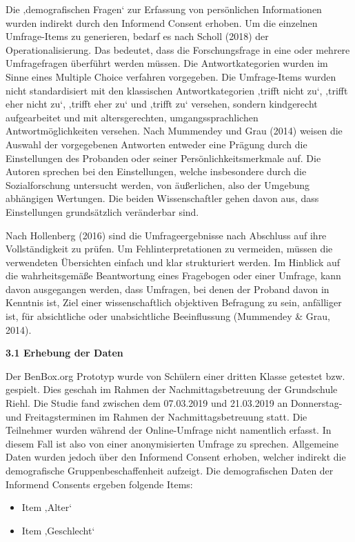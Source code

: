 \documentclass[
  a4paper,
  DIV=11,
  numbers=noendperiod,
  onecolumn,
  oneside,
  a4paper]{scrartcl}
\providecommand{\tightlist}{%
  \setlength{\itemsep}{0pt}\setlength{\parskip}{0pt}}
\begin{document}
Die ‚demografischen Fragen` zur Erfassung von persönlichen Informationen
wurden indirekt durch den Informend Consent erhoben. Um die einzelnen
Umfrage-Items zu generieren, bedarf es nach Scholl (2018) der
Operationalisierung. Das bedeutet, dass die Forschungsfrage in eine oder
mehrere Umfragefragen überführt werden müssen. Die Antwortkategorien
wurden im Sinne eines Multiple Choice verfahren vorgegeben. Die
Umfrage-Items wurden nicht standardisiert mit den klassischen
Antwortkategorien ‚trifft nicht zu`, ‚trifft eher nicht zu`, ‚trifft
eher zu` und ‚trifft zu` versehen, sondern kindgerecht aufgearbeitet und
mit altersgerechten, umgangssprachlichen Antwortmöglichkeiten versehen.
Nach Mummendey und Grau (2014) weisen die Auswahl der vorgegebenen
Antworten entweder eine Prägung durch die Einstellungen des Probanden
oder seiner Persönlichkeitsmerkmale auf. Die Autoren sprechen bei den
Einstellungen, welche insbesondere durch die Sozialforschung untersucht
werden, von äußerlichen, also der Umgebung abhängigen Wertungen. Die
beiden Wissenschaftler gehen davon aus, dass Einstellungen grundsätzlich
veränderbar sind.

Nach Hollenberg (2016) sind die Umfrageergebnisse nach Abschluss auf
ihre Vollständigkeit zu prüfen. Um Fehlinterpretationen zu vermeiden,
müssen die verwendeten Übersichten einfach und klar strukturiert werden.
Im Hinblick auf die wahrheitsgemäße Beantwortung eines Fragebogen oder
einer Umfrage, kann davon ausgegangen werden, dass Umfragen, bei denen
der Proband davon in Kenntnis ist, Ziel einer wissenschaftlich
objektiven Befragung zu sein, anfälliger ist, für absichtliche oder
unabsichtliche Beeinflussung (Mummendey \& Grau, 2014).

\textbf{3.1 Erhebung der Daten}

Der BenBox.org Prototyp wurde von Schülern einer dritten Klasse getestet
bzw. gespielt. Dies geschah im Rahmen der Nachmittagsbetreuung der
Grundschule Riehl. Die Studie fand zwischen dem 07.03.2019 und
21.03.2019 an Donnerstag- und Freitagsterminen im Rahmen der
Nachmittagsbetreuung statt. Die Teilnehmer wurden während der
Online-Umfrage nicht namentlich erfasst. In diesem Fall ist also von
einer anonymisierten Umfrage zu sprechen. Allgemeine Daten wurden jedoch
über den Informend Consent erhoben, welcher indirekt die demografische
Gruppenbeschaffenheit aufzeigt. Die demografischen Daten der Informend
Consents ergeben folgende Items:

\begin{itemize}
\tightlist
\item
  Item ‚Alter`
\item
  Item ‚Geschlecht`
\end{itemize}
\end{document}
